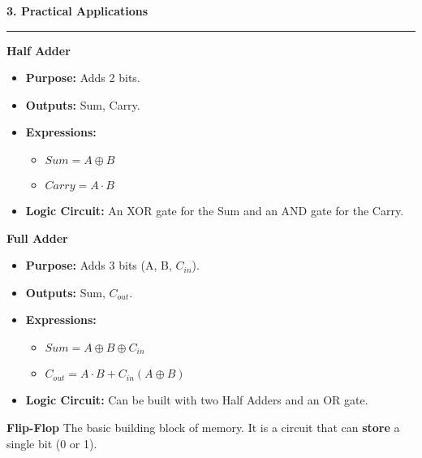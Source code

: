 \documentclass[a4paper, 8pt]{extarticle}
\newcommand{\sectionheading}[1]{\large\textbf{#1}\par\noindent\rule{\linewidth}{0.4pt}}
\newcommand{\subsectionheading}[1]{\normalsize\textbf{#1}}
\begin{document}
\begin{multicols}{3}
\sectionheading{3. Practical Applications}
\vspace{0.5em}

\subsectionheading{Half Adder}
\begin{itemize}
    \item \textbf{Purpose:} Adds 2 bits.
    \item \textbf{Outputs:} Sum, Carry.
    \item \textbf{Expressions:} 
        \begin{itemize}
            \item[] $Sum = A \oplus B$
            \item[] $Carry = A \cdot B$
        \end{itemize}
    \item \textbf{Logic Circuit:} An XOR gate for the Sum and an AND gate for the Carry.
\end{itemize}

\vspace{1em}
\subsectionheading{Full Adder}
\begin{itemize}
    \item \textbf{Purpose:} Adds 3 bits (A, B, $C_{in}$).
    \item \textbf{Outputs:} Sum, $C_{out}$.
    \item \textbf{Expressions:}
        \begin{itemize}
            \item[] $Sum = A \oplus B \oplus C_{in}$
            \item[] $C_{out} = A \cdot B + C_{in}(A \oplus B)$
        \end{itemize}
    \item \textbf{Logic Circuit:} Can be built with two Half Adders and an OR gate.
\end{itemize}

\vspace{1em}
\begin{tcolorbox}
  \subsectionheading{Flip-Flop}
  \vspace{0.25em}
  The basic building block of memory. It is a circuit that can \textbf{store} a single bit (0 or 1).
\end{tcolorbox}

\end{multicols}
\end{document}
